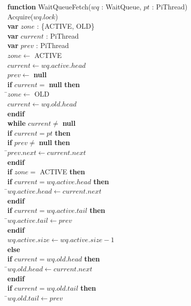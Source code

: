 \documentclass[a4paper,11pt]{article}
\newenvironment{program}{
  \begin{sffamily}
  \begin{scriptsize}
  \begin{tabbing}}
 {\end{tabbing}
  \end{scriptsize}
  \end{sffamily}}
\newcommand{\kw}[1]{\textsf{\textbf{#1}}}
\newcommand{\pindent}{\hspace{2em}\=}
\newcommand{\synchro}[1]{\textcolor{synchrocolor}{#1}}
\begin{document}
\label{WaitQueueFetch}
\begin{program}
  \kw{function} WaitQueueFetch($wq$ : WaitQueue, $pt$ : PiThread) \\
  \pindent\synchro{Acquire($wq.lock$)} \\
  \>\kw{var} $zone$ : \{ACTIVE, OLD\} \\
  \>\kw{var} $current$ : PiThread \\
  \>\kw{var} $prev$ : PiThread \\
  \>$zone \leftarrow$ ACTIVE \\
  \>$current \leftarrow wq.active.head$ \\
  \>$prev \leftarrow$ \kw{null} \\
  \>\kw{if} $current =$ \kw{null} \kw{then} \\
  \>\pindent$zone \leftarrow$ OLD \\
  \>\>$current \leftarrow wq.old.head$ \\
  \>\kw{endif} \\
  \>\kw{while} $current \neq$ \kw{null} \\
  \>\pindent\kw{if} $current = pt$ \kw{then} \\
  \>\>\pindent\kw{if} $prev \neq$ \kw{null} \kw{then} \\
  \>\>\>\pindent$prev.next \leftarrow current.next$\\
  \>\>\>\kw{endif} \\
  \>\>\>\kw{if} $zone =$ ACTIVE \kw{then} \\
  \>\>\>\pindent\kw{if} $current = wq.active.head$ \kw{then} \\
  \>\>\>\>\pindent$wq.active.head \leftarrow current.next$ \\
  \>\>\>\>\kw{endif} \\
  \>\>\>\>\kw{if} $current = wq.active.tail$ \kw{then} \\
  \>\>\>\>\pindent$wq.active.tail \leftarrow prev$ \\
  \>\>\>\>\kw{endif} \\
  \>\>\>\>$wq.active.size \leftarrow wq.active.size - 1$ \\
  \>\>\>\kw{else} \\
  \>\>\>\pindent\kw{if} $current = wq.old.head$ \kw{then} \\
  \>\>\>\>\pindent$wq.old.head \leftarrow current.next$ \\
  \>\>\>\>\kw{endif} \\
  \>\>\>\>\kw{if} $current = wq.old.tail$ \kw{then} \\
  \>\>\>\>\pindent$wq.old.tail \leftarrow prev$ \\

\end{program}
\end{document}

